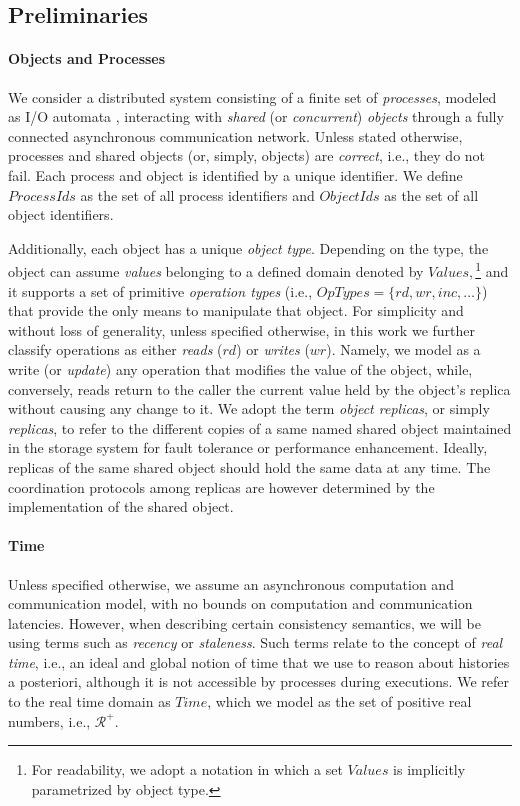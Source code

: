 \documentclass[letter, 11pt]{article}
\renewcommand{\cite}{\citep}
\begin{document}
\subsection{Preliminaries}

\paragraph{Objects and Processes}
We consider a distributed system consisting of a finite set of \emph{processes}, 
modeled as I/O automata \cite{Lynch.Tuttle:89}, 
interacting with \emph{shared} (or \emph{concurrent}) \emph{objects}  through a 
fully connected asynchronous communication network.  
Unless stated otherwise, processes and shared objects (or, simply, objects) are \emph{correct}, i.e., they do not fail. Each process and object is identified by a unique identifier.
We define $\mathit{ProcessIds}$ as the set of all process identifiers and $\mathit{ObjectIds}$ as the set of all object identifiers. 

Additionally, each object has a unique \emph{object type}.
Depending on the type, the object can assume \emph{values} belonging to a defined domain denoted by $\mathit{Values},$\footnote{For readability, we adopt a notation in which a set $\mathit{Values}$ is implicitly parametrized by object type.} 
and it supports a set of primitive \emph{operation types} (i.e., $\mathit{OpTypes} = \{rd, wr, inc, \ldots \}$)
that provide the only means to manipulate that object.
For simplicity and without loss of generality, unless specified otherwise, 
in this work we further classify operations as either 
\emph{reads} ($rd$) or \emph{writes} ($wr$). 
Namely, we model as a write (or \emph{update}) any operation that modifies the value of the object, while, conversely, 
reads return to the caller the current value held by the object's replica without
causing any change to it.
We adopt the term \emph{object replicas}, or simply \emph{replicas}, to refer to the different copies of a
same named shared object maintained in the storage system for  
fault tolerance or performance enhancement.
Ideally, replicas of the same shared object should hold the same data at any time.
The coordination protocols among replicas are however determined by the implementation of the shared object.

\paragraph{Time} Unless specified otherwise, we assume an asynchronous computation and communication model, 
with no bounds on computation and communication latencies.
However, when describing certain consistency semantics, we will be using terms such as \emph{recency} or \emph{staleness}. 
Such terms relate to the concept of \emph{real time}, i.e., an ideal and global notion of time that we use to reason about histories a posteriori, 
although it is not accessible by processes during executions. 
We refer to the real time domain as $\mathit{Time}$, which we model as the set of positive real numbers, i.e., $\mathcal{R}^+$.
\end{document}

